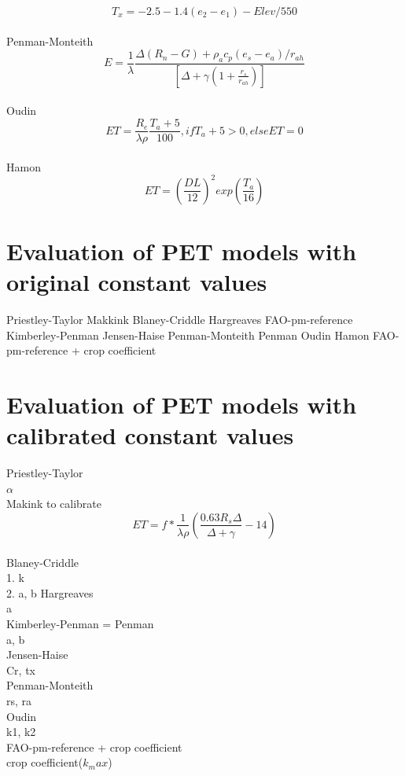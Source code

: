 \documentclass[hydrology,article,submit,moreauthors,pdftex]{Definitions/mdpi}
\begin{document}
\begin{equation}
T_x = -2.5 - 1.4 (e_2-e_1) - Elev/550
\end{equation}
\\
Penman-Monteith \cite{asce2005asce}
\begin{equation}
E = \frac{1}{\lambda} \frac{\Delta (R_{n}-G)+ \rho_a c_p  (e_{s}-e_{a})/r_{ah}}{\left[ \Delta +\gamma (1+\frac{r_s}{r_{ah}})\right]}
\end{equation}
\\
Oudin \cite{oudin2005potential}
\begin{equation}
ET = \frac{R_e}{\lambda \rho} \frac{T_a+5}{100}, if T_a + 5 > 0, else ET = 0
\end{equation}
\\
Hamon \cite{oudin2005potential}
\begin{equation}
ET = \left(\frac{DL}{12}\right)^2 exp \left(\frac{T_a}{16}\right)
\end{equation}
\section{Evaluation of PET models with original constant values}
Priestley-Taylor
Makkink
Blaney-Criddle
Hargreaves
FAO-pm-reference
Kimberley-Penman
Jensen-Haise
Penman-Monteith
Penman
Oudin
Hamon
FAO-pm-reference + crop coefficient

\section{Evaluation of PET models with calibrated constant values}

Priestley-Taylor \\
$\alpha$
\\
Makink to calibrate \cite{asce2005asce}
\begin{equation}
ET = f * \frac{1}{\lambda \rho} \left(\frac{0.63 R_s \Delta}{\Delta+\gamma}-14 \right)
\end{equation}
\\
Blaney-Criddle \\
1. k \\
2. a, b 
Hargreaves \\
a \\
Kimberley-Penman = Penman \\
a, b \\
Jensen-Haise \\
Cr, tx \\
Penman-Monteith \\
rs, ra \\
Oudin \\
k1, k2 \\
FAO-pm-reference + crop coefficient \\
crop coefficient($k_max$) 
\end{document}
